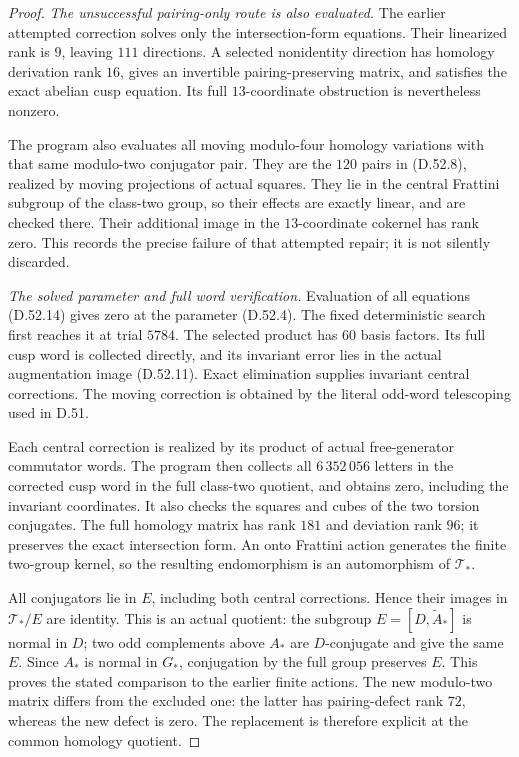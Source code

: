 \begin{proof}
\emph{The unsuccessful pairing-only route is also evaluated.}
The earlier attempted correction solves only
the intersection-form equations. Their
linearized rank is \(9\), leaving \(111\)
directions. A selected nonidentity direction
has homology derivation rank \(16\), gives
an invertible pairing-preserving matrix, and
satisfies the exact abelian cusp equation.
Its full \(13\)-coordinate obstruction is
nevertheless nonzero.

The program also evaluates all moving
modulo-four homology variations with that
same modulo-two conjugator pair. They are
the \(120\) pairs in (D.52.8), realized by
moving projections of actual squares.
They lie in the central Frattini subgroup
of the class-two group, so their effects
are exactly linear, and are checked there.
Their additional image in the \(13\)-coordinate
cokernel has rank zero. This records the
precise failure of that attempted repair;
it is not silently discarded.

\emph{The solved parameter and full word verification.}
Evaluation of all equations (D.52.14) gives
zero at the parameter (D.52.4).
The fixed deterministic search first reaches
it at trial \(5784\). The selected product
has \(60\) basis factors. Its full cusp
word is collected directly, and its
invariant error lies in the actual
augmentation image (D.52.11).
Exact elimination supplies invariant
central corrections. The moving correction
is obtained by the literal odd-word
telescoping used in D.51.

Each central correction is realized by
its product of actual free-generator
commutator words. The program then collects
all \(6\,352\,056\) letters in the corrected
cusp word in the full class-two quotient,
and obtains zero, including the invariant
coordinates. It also checks the squares
and cubes of the two torsion conjugates.
The full homology matrix has rank \(181\)
and deviation rank \(96\); it preserves
the exact intersection form. An onto
Frattini action generates the finite
two-group kernel, so the resulting
endomorphism is an automorphism of
\(\mathcal T_*\).

All conjugators lie in \(E\), including
both central corrections. Hence their
images in \(\mathcal T_*/E\) are identity.
This is an actual quotient: the subgroup
\(E=[D,\widetilde A_*]\) is normal in \(D\);
two odd complements above \(A_*\) are
\(D\)-conjugate and give the same \(E\).
Since \(A_*\) is normal in \(G_*\), conjugation
by the full group preserves \(E\).
This proves the stated comparison to the
earlier finite actions. The new modulo-two
matrix differs from the excluded one:
the latter has pairing-defect rank \(72\),
whereas the new defect is zero. The
replacement is therefore explicit at
the common homology quotient.


\end{proof}

